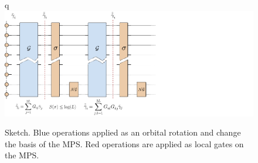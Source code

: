\documentclass[a4paper, twocolumn, superscriptaddress, longbibliography]{revtex4-2}
\begin{document}
	\begin{figure}[t]q
		\centering
		\includegraphics[width=1.\textwidth]{Figs/Sketch/Sketch_circuit.pdf}
		\caption{Sketch. Blue operations applied as an orbital rotation and change the basis of the MPS. Red operations are applied as local gates on the MPS.}
		\label{fig:sketch}
	\end{figure}
\end{document}
